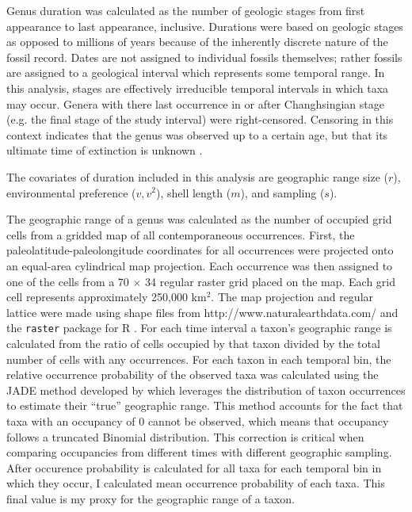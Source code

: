 \documentclass[11pt]{article}
\begin{document}
Genus duration was calculated as the number of geologic stages from first appearance to last appearance, inclusive. Durations were based on geologic stages as opposed to millions of years because of the inherently discrete nature of the fossil record. Dates are not assigned to individual fossils themselves; rather fossils are assigned to a geological interval which represents some temporal range. In this analysis, stages are effectively irreducible temporal intervals in which taxa may occur. Genera with there last occurrence in or after Changhsingian stage (e.g. the final stage of the study interval) were right-censored. Censoring in this context indicates that the genus was observed up to a certain age, but that its ultimate time of extinction is unknown \citep{Klein2003}.

The covariates of duration included in this analysis are geographic range size (\(r\)), environmental preference (\(v, v^{2}\)), shell length (\(m\)), and sampling (\(s\)).

The geographic range of a genus was calculated as the number of occupied grid cells from a gridded map of all contemporaneous occurrences. First, the paleolatitude-paleolongitude coordinates for all occurrences were projected onto an equal-area cylindrical map projection. Each occurrence was then assigned to one of the cells from a 70 \(\times\) 34 regular raster grid placed on the map. Each grid cell represents approximately 250,000 km\(^{2}\). The map projection and regular lattice were made using shape files from http://www.naturalearthdata.com/ and the \texttt{raster} package for R \citep{raster}. For each time interval a taxon's geographic range is calculated from the ratio of cells occupied by that taxon divided by the total number of cells with any occurrences. For each taxon in each temporal bin, the relative occurrence probability of the observed taxa was calculated using the \uppercase{jade} method developed by \citet{Chao2015a} which leverages the distribution of taxon occurrences to estimate their ``true'' geographic range. This method accounts for the fact that taxa with an occupancy of 0 cannot be observed, which means that occupancy follows a truncated Binomial distribution. This correction is critical when comparing occupancies from different times with different geographic sampling. After occurence probability is calculated for all taxa for each temporal bin in which they occur, I calculated mean occurrence probability of each taxa. This final value is my proxy for the geographic range of a taxon.
\end{document}
